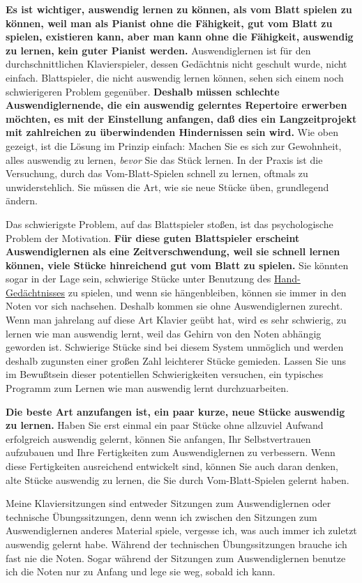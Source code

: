 \textbf{Es ist wichtiger, auswendig lernen zu können, als vom Blatt spielen zu können, weil man als Pianist ohne die Fähigkeit, gut vom Blatt zu spielen, existieren kann, aber man kann ohne die Fähigkeit, auswendig zu lernen, kein guter Pianist werden.}
Auswendiglernen ist für den durchschnittlichen Klavierspieler, dessen Gedächtnis nicht geschult wurde, nicht einfach.
Blattspieler, die nicht auswendig lernen können, sehen sich einem noch schwierigeren Problem gegenüber.
\textbf{Deshalb müssen schlechte Auswendiglernende, die ein auswendig gelerntes Repertoire erwerben möchten, es mit der Einstellung anfangen, daß dies ein Langzeitprojekt mit zahlreichen zu überwindenden Hindernissen sein wird.}
Wie oben gezeigt, ist die Lösung im Prinzip einfach: Machen Sie es sich zur Gewohnheit, alles auswendig zu lernen, \textit{bevor} Sie das Stück lernen.
In der Praxis ist die Versuchung, durch das Vom-Blatt-Spielen schnell zu lernen, oftmals zu unwiderstehlich.
Sie müssen die Art, wie sie neue Stücke üben, grundlegend ändern.

Das schwierigste Problem, auf das Blattspieler stoßen, ist das psychologische Problem der Motivation.
\textbf{Für diese guten Blattspieler erscheint Auswendiglernen als eine Zeitverschwendung, weil sie schnell lernen können, viele Stücke hinreichend gut vom Blatt zu spielen.}
Sie könnten sogar in der Lage sein, schwierige Stücke unter Benutzung des \hyperlink{c1iii6d}{Hand-Gedächtnisses} zu spielen, und wenn sie hängenbleiben, können sie immer in den Noten vor sich nachsehen.
Deshalb kommen sie ohne Auswendiglernen zurecht.
Wenn man jahrelang auf diese Art Klavier geübt hat, wird es sehr schwierig, zu lernen wie man auswendig lernt, weil das Gehirn von den Noten abhängig geworden ist.
Schwierige Stücke sind bei diesem System unmöglich und werden deshalb zugunsten einer großen Zahl leichterer Stücke gemieden.
Lassen Sie uns im Bewußtsein dieser potentiellen Schwierigkeiten versuchen, ein typisches Programm zum Lernen wie man auswendig lernt durchzuarbeiten.

\textbf{Die beste Art anzufangen ist, ein paar kurze, neue Stücke auswendig zu lernen.}
Haben Sie erst einmal ein paar Stücke ohne allzuviel Aufwand erfolgreich auswendig gelernt, können Sie anfangen, Ihr Selbstvertrauen aufzubauen und Ihre Fertigkeiten zum Auswendiglernen zu verbessern.
Wenn diese Fertigkeiten ausreichend entwickelt sind, können Sie auch daran denken, alte Stücke auswendig zu lernen, die Sie durch Vom-Blatt-Spielen gelernt haben.

Meine Klaviersitzungen sind entweder Sitzungen zum Auswendiglernen oder technische Übungssitzungen, denn wenn ich zwischen den Sitzungen zum Auswendiglernen anderes Material spiele, vergesse ich, was auch immer ich zuletzt auswendig gelernt habe.
Während der technischen Übungssitzungen brauche ich fast nie die Noten.
Sogar während der Sitzungen zum Auswendiglernen benutze ich die Noten nur zu Anfang und lege sie weg, sobald ich kann.

